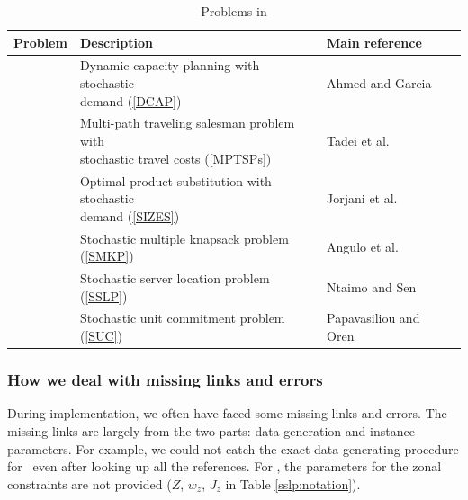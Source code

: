 \begin{table}[H]
	\centering
			\caption{Problems in \siplibtwo}
			\label{table:problems}
			\begin{tabular}{@{}llll@{}}
				\toprule
				Problem		  		  & Description                                                        & Main reference              \\ \midrule
				\dcap\         & \makecell[tl]{Dynamic capacity planning with stochastic\\ demand (\ref{DCAP}) }                  & Ahmed and Garcia \cite{journal:AG2004}                          \\
				\mptsps\       & \makecell[tl]{Multi-path traveling salesman problem with\\ stochastic travel costs (\ref{MPTSPs})}& Tadei et al. \cite{journal:TPP2017}                            \\
				\sizes\        & \makecell[tl]{Optimal product substitution with stochastic\\ demand (\ref{SIZES})}         & Jorjani et al. \cite{journal:JSW1999}          \\
				\smkp\		  & Stochastic multiple knapsack problem (\ref{SMKP})                              & Angulo et al. \cite{journal:AAD2014}                            \\
				\sslp\         & Stochastic server location problem (\ref{SSLP})                                & Ntaimo and Sen \cite{journal:NS2005}                           \\
				\suc\         & Stochastic unit commitment problem	(\ref{SUC})			               & Papavasiliou and Oren \cite{journal:PO2013}                       \\ \bottomrule
			\end{tabular}%
			
\end{table}

\subsubsection{How we deal with missing links and errors}
During implementation, we often have faced some missing links and errors. The missing links are largely from the two parts: data generation and instance parameters. For example, we could not catch the exact data generating procedure for \mptsps\ even after looking up all the references. For \sslp, the parameters for the zonal constraints are not provided ($Z$, $w_z$, $J_z$ in Table \ref{sslp:notation}). 

